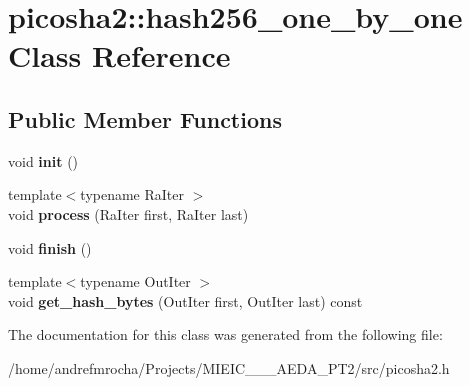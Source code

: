 \hypertarget{classpicosha2_1_1hash256__one__by__one}{}\section{picosha2\+:\+:hash256\+\_\+one\+\_\+by\+\_\+one Class Reference}
\label{classpicosha2_1_1hash256__one__by__one}
\subsection*{Public Member Functions}
\begin{DoxyCompactItemize}
\item 
\mbox{\label{classpicosha2_1_1hash256__one__by__one_a9308a2f22f9d0afbd315c9cf45458819}} 
void {\bfseries init} ()
\item 
\mbox{\label{classpicosha2_1_1hash256__one__by__one_a2ce5fc541a7c27a935eecb85b9dd6497}} 
{\footnotesize template$<$typename Ra\+Iter $>$ }\\void {\bfseries process} (Ra\+Iter first, Ra\+Iter last)
\item 
\mbox{\label{classpicosha2_1_1hash256__one__by__one_a1c2c4d24deccb590cbbd30ffeb317690}} 
void {\bfseries finish} ()
\item 
\mbox{\label{classpicosha2_1_1hash256__one__by__one_a3f9ac7afd9396f70f779cf7f99bfa4d9}} 
{\footnotesize template$<$typename Out\+Iter $>$ }\\void {\bfseries get\+\_\+hash\+\_\+bytes} (Out\+Iter first, Out\+Iter last) const
\end{DoxyCompactItemize}


The documentation for this class was generated from the following file\+:\begin{DoxyCompactItemize}
\item 
/home/andrefmrocha/\+Projects/\+M\+I\+E\+I\+C\+\_\+\_\+\_\+\+A\+E\+D\+A\+\_\+\+P\+T2/src/picosha2.\+h\end{DoxyCompactItemize}
